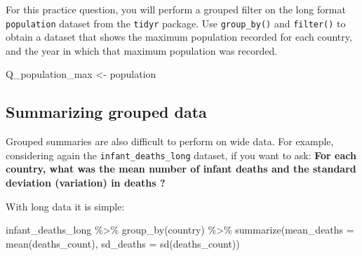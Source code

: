 \documentclass[
  letterpaper,
  DIV=11,
  numbers=noendperiod]{scrreprt}
\newenvironment{Shaded}{\begin{snugshade}}{\end{snugshade}}
\newcommand{\AttributeTok}[1]{\textcolor[rgb]{0.40,0.45,0.13}{#1}}
\newcommand{\FunctionTok}[1]{\textcolor[rgb]{0.28,0.35,0.67}{#1}}
\newcommand{\NormalTok}[1]{\textcolor[rgb]{0.00,0.23,0.31}{#1}}
\newcommand{\OtherTok}[1]{\textcolor[rgb]{0.00,0.23,0.31}{#1}}
\newcommand{\SpecialCharTok}[1]{\textcolor[rgb]{0.37,0.37,0.37}{#1}}
\begin{document}
\begin{tcolorbox}[enhanced jigsaw, colframe=quarto-callout-tip-color-frame, rightrule=.15mm, opacityback=0, breakable, coltitle=black, colbacktitle=quarto-callout-tip-color!10!white, bottomrule=.15mm, leftrule=.75mm, toprule=.15mm, arc=.35mm, bottomtitle=1mm, colback=white, left=2mm, opacitybacktitle=0.6, titlerule=0mm, title=\textcolor{quarto-callout-tip-color}{\faLightbulb}\hspace{0.5em}{Practice}, toptitle=1mm]

For this practice question, you will perform a grouped filter on the
long format \texttt{population} dataset from the \texttt{tidyr} package.
Use \texttt{group\_by()} and \texttt{filter()} to obtain a dataset that
shows the maximum population recorded for each country, and the year in
which that maximum population was recorded.

\begin{Shaded}
\begin{Highlighting}[]
\NormalTok{Q\_population\_max }\OtherTok{\textless{}{-}} 
\NormalTok{  population }
\end{Highlighting}
\end{Shaded}

\end{tcolorbox}

\hypertarget{summarizing-grouped-data}{%
\subsection{Summarizing grouped data}\label{summarizing-grouped-data}}

Grouped summaries are also difficult to perform on wide data. For
example, considering again the \texttt{infant\_deaths\_long} dataset, if
you want to ask: \textbf{For each country, what was the mean number of
infant deaths and the standard deviation (variation) in deaths ?}

With long data it is simple:

\begin{Shaded}
\begin{Highlighting}[]
\NormalTok{infant\_deaths\_long }\SpecialCharTok{\%\textgreater{}\%} 
  \FunctionTok{group\_by}\NormalTok{(country) }\SpecialCharTok{\%\textgreater{}\%} 
  \FunctionTok{summarize}\NormalTok{(}\AttributeTok{mean\_deaths =} \FunctionTok{mean}\NormalTok{(deaths\_count), }
            \AttributeTok{sd\_deaths =} \FunctionTok{sd}\NormalTok{(deaths\_count))}
\end{Highlighting}
\end{Shaded}
\end{document}
